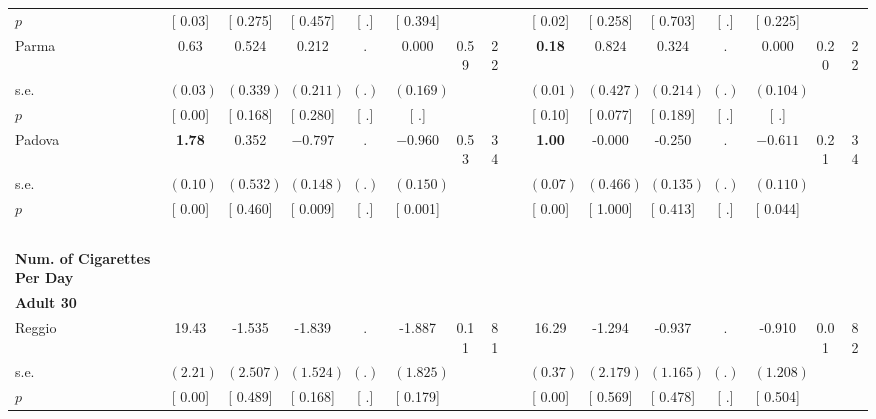 \begin{longtable}{L{8em} c c c c c c c p{1em} c c c c c c c}
\quad \quad \quad \quad $ p$ & [     0.03] & [    0.275] & [    0.457] & [        .] & [    0.394] & & & & [     0.02] & [    0.258] & [    0.703] & [        .] & [    0.225] & &  \\[1em]
\quad \quad \quad Parma& 0.63 &     0.524 &     0.212 &         . &     0.000 &      0.59 &        22 & & \textbf{     0.18} & $ \mathbf{    0.824}$ &     0.324 &         . &     0.000 &      0.20 &        22  \\*
\quad \quad \quad \quad s.e.& $ (     0.03)$ & $ (    0.339)$ & $ (    0.211)$ & $ (        .)$ & $ (    0.169)$ & & & & $ (     0.01)$ & $ (    0.427)$ & $ (    0.214)$ & $ (        .)$ & $ (    0.104)$ & &  \\*
\quad \quad \quad \quad $ p$ & [     0.00] & [    0.168] & [    0.280] & [        .] & [        .] & & & & [     0.10] & [    0.077] & [    0.189] & [        .] & [        .] & &  \\[1em]
\quad \quad \quad Padova& \textbf{     1.78} &     0.352 & $ \mathbf{   -0.797}$ &         . & $ \mathbf{   -0.960}$ &      0.53 &        34 & & \textbf{     1.00} &    -0.000 &    -0.250 &         . & $ \mathbf{   -0.611}$ &      0.21 &        34  \\*
\quad \quad \quad \quad s.e.& $ (     0.10)$ & $ (    0.532)$ & $ (    0.148)$ & $ (        .)$ & $ (    0.150)$ & & & & $ (     0.07)$ & $ (    0.466)$ & $ (    0.135)$ & $ (        .)$ & $ (    0.110)$ & &  \\*
\quad \quad \quad \quad $ p$ & [     0.00] & [    0.460] & [    0.009] & [        .] & [    0.001] & & & & [     0.00] & [    1.000] & [    0.413] & [        .] & [    0.044] & &  \\[1em]
~\\[1em]
\textbf{Num. of Cigarettes Per Day} \\*
\quad \quad \textbf{Adult 30} & & & & & & & & & & & & & & & \\* 
\quad \quad \quad Reggio& 19.43 &    -1.535 &    -1.839 &         . &    -1.887 &      0.11 &        81 & & 16.29 &    -1.294 &    -0.937 &         . &    -0.910 &      0.01 &        82  \\*
\quad \quad \quad \quad s.e.& $ (     2.21)$ & $ (    2.507)$ & $ (    1.524)$ & $ (        .)$ & $ (    1.825)$ & & & & $ (     0.37)$ & $ (    2.179)$ & $ (    1.165)$ & $ (        .)$ & $ (    1.208)$ & &  \\*
\quad \quad \quad \quad $ p$ & [     0.00] & [    0.489] & [    0.168] & [        .] & [    0.179] & & & & [     0.00] & [    0.569] & [    0.478] & [        .] & [    0.504] & &  \\[1em]

\end{longtable}
